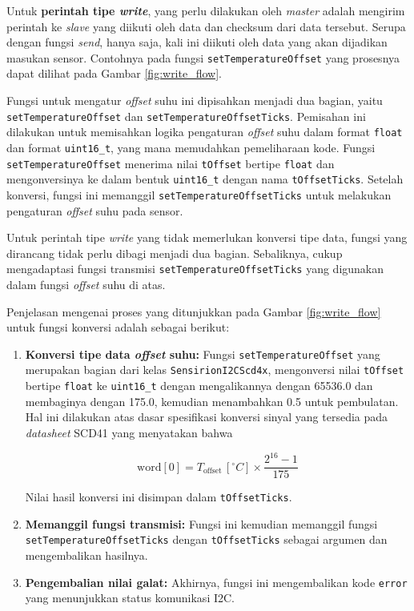         Untuk \textbf{perintah tipe \textit{write}}, yang perlu dilakukan oleh \textit{master} adalah mengirim perintah ke \textit{slave} yang diikuti oleh data dan checksum dari data tersebut. Serupa dengan fungsi \textit{send}, hanya saja, kali ini diikuti oleh data yang akan dijadikan masukan sensor. Contohnya pada fungsi \texttt{setTemperatureOffset} yang prosesnya dapat dilihat pada Gambar \ref{fig:write_flow}.  

        Fungsi untuk mengatur \textit{offset} suhu ini dipisahkan menjadi dua bagian, yaitu \\ \texttt{setTemperatureOffset} dan \texttt{setTemperatureOffsetTicks}. Pemisahan ini dilakukan untuk memisahkan logika pengaturan \textit{offset} suhu dalam format \texttt{float} dan format \texttt{uint16\_t}, yang mana memudahkan pemeliharaan kode. Fungsi \\ \texttt{setTemperatureOffset} menerima nilai \texttt{tOffset} bertipe \texttt{float} dan mengonversinya ke dalam bentuk \texttt{uint16\_t} dengan nama \texttt{tOffsetTicks}. Setelah konversi, fungsi ini memanggil \texttt{setTemperatureOffsetTicks} untuk melakukan pengaturan \textit{offset} suhu pada sensor. 

        Untuk perintah tipe \textit{write} yang tidak memerlukan konversi tipe data, fungsi yang dirancang tidak perlu dibagi menjadi dua bagian. Sebaliknya, cukup mengadaptasi fungsi transmisi \texttt{setTemperatureOffsetTicks} yang digunakan dalam fungsi \textit{offset} suhu di atas.

        Penjelasan mengenai proses yang ditunjukkan pada Gambar \ref{fig:write_flow} untuk fungsi konversi adalah sebagai berikut:

        \begin{enumerate}
            \item \textbf{Konversi tipe data \textit{offset} suhu:} Fungsi \texttt{setTemperatureOffset} yang merupakan bagian dari kelas \texttt{SensirionI2CScd4x}, mengonversi nilai \texttt{tOffset} bertipe \texttt{float} ke \texttt{uint16\_t} dengan mengalikannya dengan 65536.0 dan membaginya dengan 175.0, kemudian menambahkan 0.5 untuk pembulatan. Hal ini dilakukan atas dasar spesifikasi konversi sinyal yang tersedia pada \textit{datasheet} SCD41 \cite{scd4x_datasheet} yang menyatakan bahwa  

            \[ \text{word}[0] = T_{\text{offset}} \, [\text{$^{\circ}$}{C}] \times \frac{2^{16} - 1}{175} \]

            Nilai hasil konversi ini disimpan dalam \texttt{tOffsetTicks}.

            \item \textbf{Memanggil fungsi transmisi: }Fungsi ini kemudian memanggil fungsi \\ \texttt{setTemperatureOffsetTicks} dengan \texttt{tOffsetTicks} sebagai argumen dan mengembalikan hasilnya.

            \item \textbf{Pengembalian nilai galat:} Akhirnya, fungsi ini mengembalikan kode \texttt{error} yang menunjukkan status komunikasi I2C.
        \end{enumerate}
        
